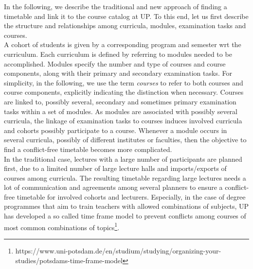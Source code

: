 \documentclass{easychair}
\newcommand{\UP}{UP}
\begin{document}
  In the following, we describe the traditional and new approach of finding a timetable and link it to the course catalog at \UP{}. 
  To this end, let us first describe the structure and relationships among curricula, modules, examination tasks and courses. \\
  A cohort of students is given by a corresponding program and semester wrt the curriculum. 
  Each curriculum is defined by referring to modules needed to be accomplished. 
  Modules specify the number and type of courses and course components, along with their primary and secondary examination tasks. 
  For simplicity, in the following, we use the term \textit{courses} to refer to both courses and course components, explicitly indicating the distinction when necessary. 
  Courses are linked to, possibly several, secondary and sometimes primary examination tasks within a set of modules. 
  As modules are associated with possibly several curricula, the linkage of examination tasks to courses induces involved curricula and cohorts possibly participate to a course. 
  Whenever a module occurs in several curricula, possibly of different institutes or faculties, then the objective to find a conflict-free timetable becomes more complicated. \\
  In the traditional case, lectures with a large number of participants are planned first, due to a limited number of large lecture halls and imports/exports of courses among curricula. 
  The resulting timetable regarding large lectures needs a lot of communication and agreements among several planners to ensure a conflict-free timetable for involved cohorts and lecturers. 
  Especially, in the case of degree programmes that aim to train teachers with allowed combinations of subjects, \UP{} has developed a so called time frame model to prevent conflicts among courses of most common combinations of topics\footnote{https://www.uni-potsdam.de/en/studium/studying/organizing-your-studies/potsdams-time-frame-model}.
\end{document}
